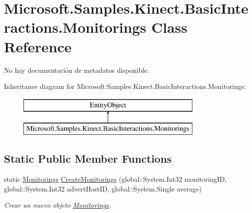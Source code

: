 \hypertarget{class_microsoft_1_1_samples_1_1_kinect_1_1_basic_interactions_1_1_monitorings}{\section{Microsoft.\-Samples.\-Kinect.\-Basic\-Interactions.\-Monitorings Class Reference}
\label{class_microsoft_1_1_samples_1_1_kinect_1_1_basic_interactions_1_1_monitorings}
}


No hay documentación de metadatos disponible.  


Inheritance diagram for Microsoft.\-Samples.\-Kinect.\-Basic\-Interactions.\-Monitorings\-:\begin{figure}[H]
\begin{center}
\leavevmode
\includegraphics[height=2.000000cm]{class_microsoft_1_1_samples_1_1_kinect_1_1_basic_interactions_1_1_monitorings}
\end{center}
\end{figure}
\subsection*{Static Public Member Functions}
\begin{DoxyCompactItemize}
\item 
static \hyperlink{class_microsoft_1_1_samples_1_1_kinect_1_1_basic_interactions_1_1_monitorings}{Monitorings} \hyperlink{class_microsoft_1_1_samples_1_1_kinect_1_1_basic_interactions_1_1_monitorings_a48162e5641aef89f8b7a1bcac945782d}{Create\-Monitorings} (global\-::\-System.\-Int32 monitoring\-I\-D, global\-::\-System.\-Int32 advert\-Host\-I\-D, global\-::\-System.\-Single average)
\begin{DoxyCompactList}\small\item\em Crear un nuevo objeto \hyperlink{class_microsoft_1_1_samples_1_1_kinect_1_1_basic_interactions_1_1_monitorings}{Monitorings}. \end{DoxyCompactList}\end{DoxyCompactItemize}
